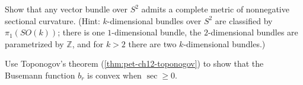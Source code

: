 \begin{remark}
  \label{rem:pet-ch12-ex-12-8-8}
  Show that any vector bundle over $S^2$ admits a complete metric of
  nonnegative sectional curvature. (Hint: $k$-dimensional bundles over $S^2$
  are classified by $\pi_1(SO(k))$; there is one $1$-dimensional bundle, the
  $2$-dimensional bundles are parametrized by $\mathbb{Z}$, and for $k>2$ there
  are two $k$-dimensional bundles.)
\end{remark}

\begin{remark}
  \label{rem:pet-ch12-ex-12-8-9}
  Use Toponogov's theorem (\cref{thm:pet-ch12-toponogov}) to show that the
  Busemann function $b_r$ is convex when $\sec\ge0$.
\end{remark}
